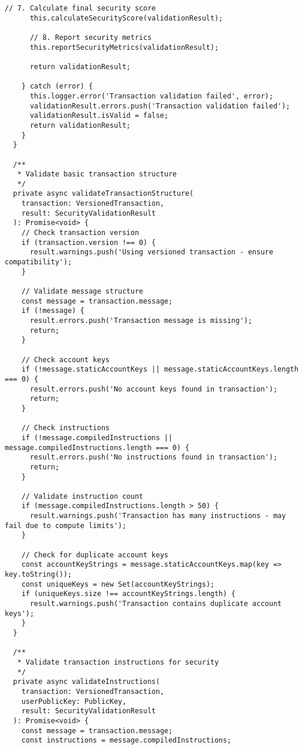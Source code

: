 \documentclass[11pt,a4paper]{article}
\begin{document}
\begin{lstlisting}[style=typescript, caption=Comprehensive Transaction Security]
      // 7. Calculate final security score
      this.calculateSecurityScore(validationResult);

      // 8. Report security metrics
      this.reportSecurityMetrics(validationResult);

      return validationResult;

    } catch (error) {
      this.logger.error('Transaction validation failed', error);
      validationResult.errors.push('Transaction validation failed');
      validationResult.isValid = false;
      return validationResult;
    }
  }

  /**
   * Validate basic transaction structure
   */
  private async validateTransactionStructure(
    transaction: VersionedTransaction,
    result: SecurityValidationResult
  ): Promise<void> {
    // Check transaction version
    if (transaction.version !== 0) {
      result.warnings.push('Using versioned transaction - ensure compatibility');
    }

    // Validate message structure
    const message = transaction.message;
    if (!message) {
      result.errors.push('Transaction message is missing');
      return;
    }

    // Check account keys
    if (!message.staticAccountKeys || message.staticAccountKeys.length === 0) {
      result.errors.push('No account keys found in transaction');
      return;
    }

    // Check instructions
    if (!message.compiledInstructions || message.compiledInstructions.length === 0) {
      result.errors.push('No instructions found in transaction');
      return;
    }

    // Validate instruction count
    if (message.compiledInstructions.length > 50) {
      result.warnings.push('Transaction has many instructions - may fail due to compute limits');
    }

    // Check for duplicate account keys
    const accountKeyStrings = message.staticAccountKeys.map(key => key.toString());
    const uniqueKeys = new Set(accountKeyStrings);
    if (uniqueKeys.size !== accountKeyStrings.length) {
      result.warnings.push('Transaction contains duplicate account keys');
    }
  }

  /**
   * Validate transaction instructions for security
   */
  private async validateInstructions(
    transaction: VersionedTransaction,
    userPublicKey: PublicKey,
    result: SecurityValidationResult
  ): Promise<void> {
    const message = transaction.message;
    const instructions = message.compiledInstructions;


\end{lstlisting}
\end{document}
